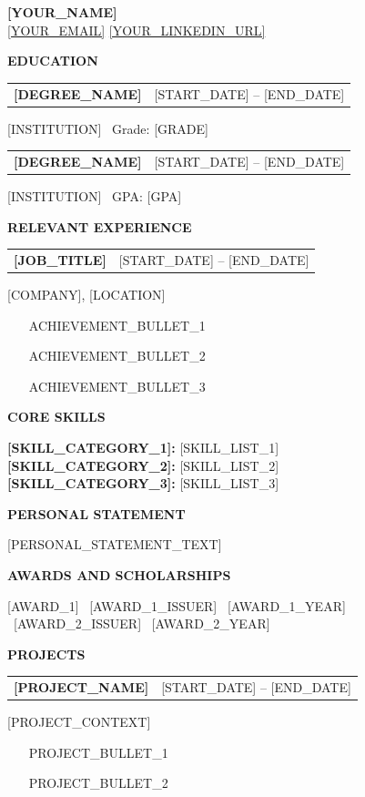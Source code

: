 \documentclass[11pt,a4paper]{article}
\makeatletter
\newcommand{\cvsection}[1]{%
  \vspace{6pt}%
  \noindent\colorbox{headingfill}{\parbox{\dimexpr\textwidth-2\fboxsep}{\textbf{\MakeUppercase{#1}}}}%
  \vspace{4pt}%
}
\newcommand{\cventry}[2]{%
  \noindent\begin{tabularx}{\textwidth}{@{}X r@{}}
    \textbf{#1} & #2
  \end{tabularx}%
}
\makeatother
\begin{document}
\pagestyle{empty}

\begin{center}
  {\LARGE \textbf{[YOUR_NAME]}}\\[4pt]
  \href{mailto:[YOUR_EMAIL]}{[YOUR_EMAIL]}  \quad
  \href{https://[YOUR_LINKEDIN_URL]}{[YOUR_LINKEDIN_URL]}
\end{center}

\cvsection{Education}

\cventry{[DEGREE_NAME]}{[START_DATE] -- [END_DATE]}
[INSTITUTION] \textbar\ Grade: [GRADE]

\vspace{4pt}
\cventry{[DEGREE_NAME]}{[START_DATE] -- [END_DATE]}
[INSTITUTION] \textbar\ GPA: [GPA]

\cvsection{Relevant Experience}

\cventry{[JOB_TITLE]}{[START_DATE] -- [END_DATE]}
[COMPANY], [LOCATION]
\begin{itemize}
  \item [ACHIEVEMENT_BULLET_1]
  \item [ACHIEVEMENT_BULLET_2]
  \item [ACHIEVEMENT_BULLET_3]
\end{itemize}

\cvsection{Core Skills}

\textbf{[SKILL_CATEGORY_1]:} [SKILL_LIST_1]\\
\textbf{[SKILL_CATEGORY_2]:} [SKILL_LIST_2]\\
\textbf{[SKILL_CATEGORY_3]:} [SKILL_LIST_3]

\cvsection{Personal Statement}

[PERSONAL_STATEMENT_TEXT]

\cvsection{Awards and Scholarships}

[AWARD_1] \textbar\ [AWARD_1_ISSUER] \textbar\ [AWARD_1_YEAR]\\
[AWARD_2] \textbar\ [AWARD_2_ISSUER] \textbar\ [AWARD_2_YEAR]

\cvsection{Projects}

\cventry{[PROJECT_NAME]}{[START_DATE] -- [END_DATE]}
[PROJECT_CONTEXT]
\begin{itemize}
  \item [PROJECT_BULLET_1]
  \item [PROJECT_BULLET_2]
\end{itemize}
\end{document}
